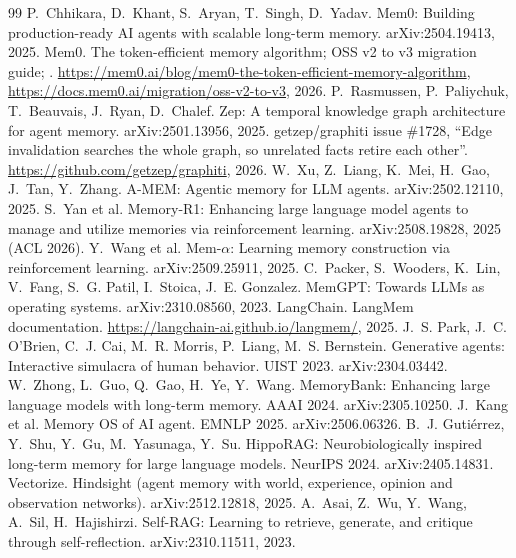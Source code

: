 \renewcommand{\refname}{References}
\begin{thebibliography}{99}\small
\setlength{\itemsep}{2pt}
 P.~Chhikara, D.~Khant, S.~Aryan, T.~Singh, D.~Yadav. Mem0: Building production-ready AI agents with scalable
long-term memory. arXiv:2504.19413, 2025.
 Mem0. The token-efficient memory algorithm; OSS v2 to v3 migration guide; .
\url{https://mem0.ai/blog/mem0-the-token-efficient-memory-algorithm}, \url{https://docs.mem0.ai/migration/oss-v2-to-v3}, 2026.
 P.~Rasmussen, P.~Paliychuk, T.~Beauvais, J.~Ryan, D.~Chalef. Zep: A temporal knowledge graph architecture for
agent memory. arXiv:2501.13956, 2025.
 getzep/graphiti issue \#1728, ``Edge invalidation searches the whole graph, so unrelated facts retire
each other''. \url{https://github.com/getzep/graphiti}, 2026.
 W.~Xu, Z.~Liang, K.~Mei, H.~Gao, J.~Tan, Y.~Zhang. A-MEM: Agentic memory for LLM agents. arXiv:2502.12110,
2025.
 S.~Yan et al. Memory-R1: Enhancing large language model agents to manage and utilize memories via
reinforcement learning. arXiv:2508.19828, 2025 (ACL 2026).
 Y.~Wang et al. Mem-$\alpha$: Learning memory construction via reinforcement learning. arXiv:2509.25911,
2025.
 C.~Packer, S.~Wooders, K.~Lin, V.~Fang, S.~G. Patil, I.~Stoica, J.~E. Gonzalez. MemGPT: Towards LLMs as
operating systems. arXiv:2310.08560, 2023.
 LangChain. LangMem documentation. \url{https://langchain-ai.github.io/langmem/}, 2025.
 J.~S. Park, J.~C. O'Brien, C.~J. Cai, M.~R. Morris, P.~Liang, M.~S. Bernstein. Generative agents:
Interactive simulacra of human behavior. UIST 2023. arXiv:2304.03442.
 W.~Zhong, L.~Guo, Q.~Gao, H.~Ye, Y.~Wang. MemoryBank: Enhancing large language models with long-term
memory. AAAI 2024. arXiv:2305.10250.
 J.~Kang et al. Memory OS of AI agent. EMNLP 2025. arXiv:2506.06326.
 B.~J. Guti\'errez, Y.~Shu, Y.~Gu, M.~Yasunaga, Y.~Su. HippoRAG: Neurobiologically inspired long-term
memory for large language models. NeurIPS 2024. arXiv:2405.14831.
 Vectorize. Hindsight (agent memory with world, experience, opinion and observation networks). arXiv:2512.12818, 2025.
 A.~Asai, Z.~Wu, Y.~Wang, A.~Sil, H.~Hajishirzi. Self-RAG: Learning to retrieve, generate, and critique
through self-reflection. arXiv:2310.11511, 2023.

\end{thebibliography}
